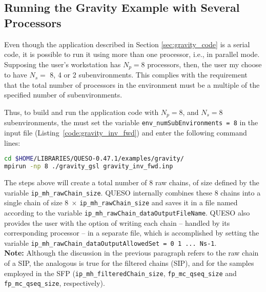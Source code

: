 




\subsection{Running the Gravity Example with Several Processors}

Even though the application described in Section \ref{sec:gravity_code} is a serial code, it is possible to run it using more than one processor, i.e., in parallel mode. 
Supposing the user's workstation has $N_p=8$ processors, then, the user my choose to have $N_s =$ 8, 4 or 2 subenvironments. This complies with the requirement that the total number of processors in the environment must be a multiple of the specified number of subenvironments.

Thus, to build and run the application code with $N_p = 8$, and $N_s=8$ subenvironments, the must set the variable \texttt{env\_numSubEnvironments = 8} in the input file (Listing~\ref{code:gravity_inv_fwd}) and enter the following command lines: 



\begin{lstlisting}[caption={}, label={},language={bash}]
cd $HOME/LIBRARIES/QUESO-0.47.1/examples/gravity/
mpirun -np 8 ./gravity_gsl gravity_inv_fwd.inp
\end{lstlisting}


The steps above will create a total number of 8 raw chains, of size defined by the variable \texttt{ip\_mh\_rawChain\_size}. QUESO internally combines these 8 chains into a single chain of size $8\; \times\,$\texttt{ip\_mh\_rawChain\_size} and saves it in a file named according to the variable \texttt{ip\_mh\_rawChain\_dataOutputFileName}. 
QUESO also provides the user with the option of writing each chain -- handled by its corresponding processor -- in a separate file, which is accomplished by setting the variable \texttt{ip\_mh\_rawChain\_dataOutputAllowedSet = 0 1 ... Ns-1}.\\

\noindent
{\bf Note:} Although the discussion in the previous paragraph refers to the raw chain of a SIP, the analogous is true for the filtered chains (SIP), and for the samples employed in the SFP (\texttt{ip\_mh\_filteredChain\_size},    \texttt{fp\_mc\_qseq\_size} and \texttt{fp\_mc\_qseq\_size}, respectively). 




